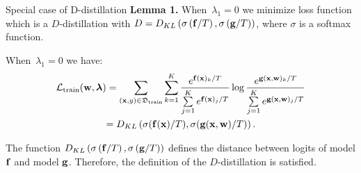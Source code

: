 \documentclass[12pt, aspectratio=169]{beamer}
\begin{document}
\begin{frame}{Special case of D-distillation}
\textbf{Lemma 1.}
When~$\lambda_1 = 0$ we minimize loss function which is a $D$-distillation with $D = D_{KL}\left(\sigma\left(\mathbf{f}/T\right), \sigma\left(\mathbf{g}/T\right)\right)$, where $\sigma$ is a softmax function.

When~$\lambda_1 = 0$ we have:
\begin{multline*}
    \mathcal{L}_\text{train}(\mathbf{w}, \boldsymbol{\lambda}) = \sum\limits_{(\mathbf{x}, y) \in \mathfrak{D}_\text{train}}\sum\limits_{k=1}^{K}\frac{e^{\mathbf{f}(\mathbf{x})_k/T}}{\sum\limits_{j=1}^{K}e^{\mathbf{f}(\mathbf{x})_j/T}}\log \frac{e^{\mathbf{g}(\mathbf{x}, \mathbf{w})_k/T}}{\sum\limits_{j=1}^{K}e^{\mathbf{g}(\mathbf{x}, \mathbf{w})_j/T}} \\= D_{KL}\left(\sigma(\mathbf{f}(\mathbf{x})/T), \sigma(\mathbf{g}(\mathbf{x}, \mathbf{w})/T)\right).
\end{multline*}

The function $D_{KL}\left(\sigma\left(\mathbf{f}/T\right), \sigma\left(\mathbf{g}/T\right)\right)$ defines the distance between logits of model $\mathbf{f}$ and model $\mathbf{g}$. Therefore, the definition of the $D$-distillation is satisfied.





\end{frame}
\end{document}
